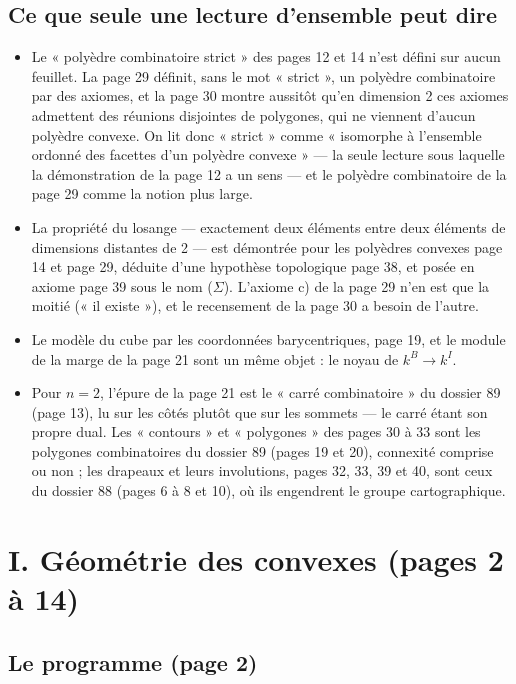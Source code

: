 \documentclass[11pt,a4paper]{article}
\begin{document}
\subsection*{Ce que seule une lecture d'ensemble peut dire}

\begin{itemize}
\item Le « polyèdre combinatoire strict » des pages 12 et 14 n'est défini sur
aucun feuillet. La page 29 définit, sans le mot « strict », un polyèdre
combinatoire par des axiomes, et la page 30 montre aussitôt qu'en dimension 2
ces axiomes admettent des réunions disjointes de polygones, qui ne viennent
d'aucun polyèdre convexe. On lit donc « strict » comme « isomorphe à
l'ensemble ordonné des facettes d'un polyèdre convexe » --- la seule lecture
sous laquelle la démonstration de la page 12 a un sens --- et le polyèdre
combinatoire de la page 29 comme la notion plus large.
\item La propriété du losange --- exactement deux éléments entre deux éléments
de dimensions distantes de 2 --- est démontrée pour les polyèdres convexes
page 14 et page 29, déduite d'une hypothèse topologique page 38, et posée en
axiome page 39 sous le nom ($\Sigma$). L'axiome c) de la page 29 n'en est que
la moitié (« il existe »), et le recensement de la page 30 a besoin de l'autre.
\item Le modèle du cube par les coordonnées barycentriques, page 19, et le
module de la marge de la page 21 sont un même objet : le noyau de
$k^{B} \to k^{I}$.
\item Pour $n = 2$, l'épure de la page 21 est le « carré combinatoire » du
dossier 89 (page 13), lu sur les côtés plutôt que sur les sommets --- le carré
étant son propre dual. Les « contours » et « polygones » des pages 30 à 33 sont
les polygones combinatoires du dossier 89 (pages 19 et 20), connexité comprise
ou non ; les drapeaux et leurs involutions, pages 32, 33, 39 et 40, sont ceux du
dossier 88 (pages 6 à 8 et 10), où ils engendrent le groupe cartographique.
\end{itemize}

\section*{I. Géométrie des convexes (pages 2 à 14)}

\subsection*{Le programme (page 2)}
\end{document}
